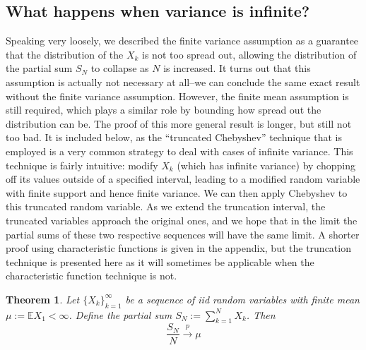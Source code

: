 \documentclass[12pt]{article}
\newcommand{\E}{\mathbb{E}}
\newtheorem{thm}{Theorem}
\begin{document}
\subsection{What happens when variance is infinite?}
Speaking very loosely, we described the finite variance assumption as a guarantee that the distribution of the $X_k$ is not too spread out, allowing the distribution of the partial sum $S_N$ to collapse as $N$ is increased. 
It turns out that this assumption is actually not necessary at all--we can conclude the same exact result without the finite variance assumption. However, the finite mean assumption is still required, which plays a similar role by 
bounding how spread out the distribution can be. The proof of this more general result is longer, but still not too bad. It is included below, as the ``truncated Chebyshev'' technique that is employed is a very common strategy to 
deal with cases of infinite variance. This technique is fairly intuitive: modify $X_k$ (which has infinite variance) by chopping off its values outside of a specified interval, leading to a modified random variable with finite support and 
hence finite variance. We can then apply Chebyshev to this truncated random variable. As we extend the truncation interval, the truncated variables approach the original ones, and we hope that in the limit the partial sums of these 
two respective sequences will have the same limit. A shorter proof using characteristic functions is given in the appendix, but the truncation technique is presented here as it will sometimes be applicable when the 
characteristic function technique is not. 

\begin{thm}
Let $\{X_k\}_{k = 1}^{\infty}$ be a sequence of iid random variables with finite mean $\mu := \E X_1 < \infty$. Define the partial sum $S_N := \sum_{k = 1}^{N} X_k$. Then 
\[\frac{S_N}{N} \overset{p}{\to} \mu\]
\end{thm}
\end{document}
